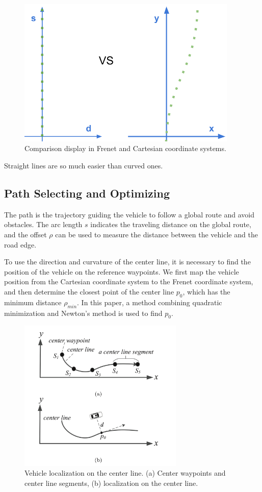 \begin{figure}[h]
\centering
\includegraphics[height=2.8in]{figs/ch3/frenet-final}
\caption{Comparison display in Frenet and Cartesian coordinate systems.}
\label{fig:frenet-final}
\end{figure}

Straight lines are so much easier than curved ones.

\subsection{Path Selecting and Optimizing}

The path is the trajectory guiding the vehicle to follow a global route and avoid obstacles. The arc length $s$ indicates the traveling distance on the global route, and the offset $\rho$ can be used to measure the distance between the vehicle and the road edge.

To use the direction and curvature of the center line, it is necessary to find the position of the vehicle on the reference waypoints. We first map the vehicle position from the Cartesian coordinate system to the Frenet coordinate system, and then determine the closest point of the center line $p_0$, which has the minimum distance $\rho_{min}$. In this paper, a method combining quadratic minimization and Newton's method is used to find $p_0$.

\begin{figure}[h]
\centering
\includegraphics[width=0.7\textwidth]{figs/ch3/location-on-center-line}
\caption{Vehicle localization on the center line. (a) Center waypoints and center line segments, (b) localization on the center line.}
\label{fig:loc-line}
\end{figure}

